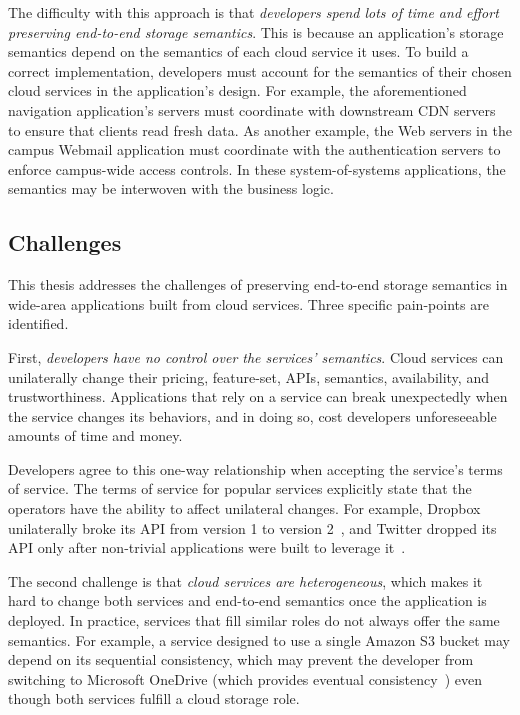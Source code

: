 The difficulty with this approach is that \emph{developers spend lots of
time and effort preserving end-to-end storage semantics}.  This is because an application's
storage semantics depend on the semantics of each cloud service it uses.  
To build a correct implementation, developers must account for
the semantics of their chosen cloud services in the application's design.
For example, the aforementioned navigation application's servers
must coordinate with downstream CDN servers to ensure that
clients read fresh data.  As another example, the Web servers in the
campus Webmail application must coordinate with 
the authentication servers to enforce campus-wide access controls.
In these system-of-systems applications, the semantics may be interwoven
with the business logic.

\subsection{Challenges}

This thesis addresses the challenges of preserving end-to-end storage semantics
in wide-area applications built from cloud services.  Three specific
pain-points are identified.

First, \emph{developers have no control over the services' semantics}.
Cloud services can unilaterally
change their pricing, feature-set, APIs, semantics, availability, and
trustworthiness.  Applications that rely on a service can break unexpectedly
when the service changes its behaviors, and in doing so,
cost developers unforeseeable amounts of time and money.

Developers agree to this one-way relationship when accepting the service's terms of service.  The terms of
service for popular services explicitly state that the operators have the ability to affect unilateral
changes.  For example, Dropbox unilaterally broke its API from version 1 to version
2~\cite{dropbox-v2-api-psa}, and Twitter dropped its API only after non-trivial
applications were built to leverage it~\cite{twitter-api-deprecation-psa}.

The second challenge is that \emph{cloud services are heterogeneous}, which
makes it hard to change both services and end-to-end semantics once the application is deployed.
In practice, services that fill similar roles do not always offer the same semantics.
For example, a service designed to use a single Amazon S3 bucket may 
depend on its sequential consistency, which may prevent the developer from
switching to Microsoft OneDrive (which provides eventual
consistency~\cite{consistency-comparison-cloud-storage}) even though both
services fulfill a cloud storage role.   %

